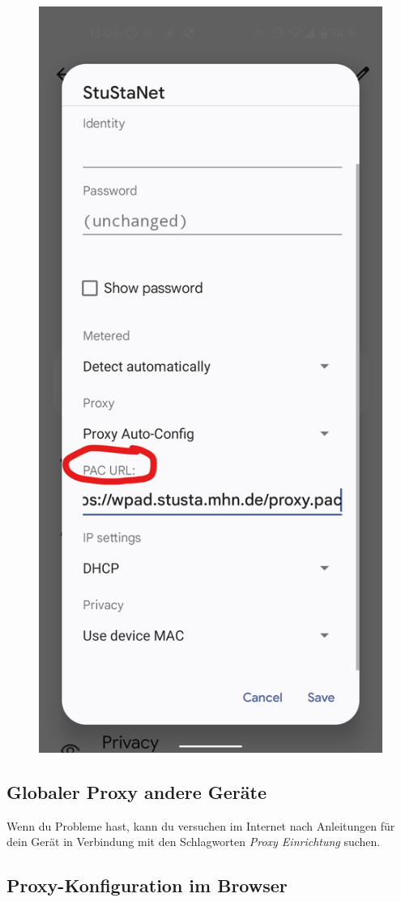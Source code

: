 \documentclass[a4paper,12pt]{scrartcl}
\begin{document}
\begin{figure}[h]
\begin{minipage}{0.20\textwidth}
		\includegraphics[width=0.7\linewidth,keepaspectratio]{Bilder/Android/android12_4}
	\end{minipage}
\end{figure}

\subsection{Globaler Proxy andere Geräte}
Wenn du Probleme hast, kann du versuchen im Internet nach Anleitungen für dein Gerät in Verbindung mit den Schlagworten \textit{Proxy Einrichtung} suchen.

\subsection{Proxy-Konfiguration im Browser}
\label{Proxy}
\end{document}
